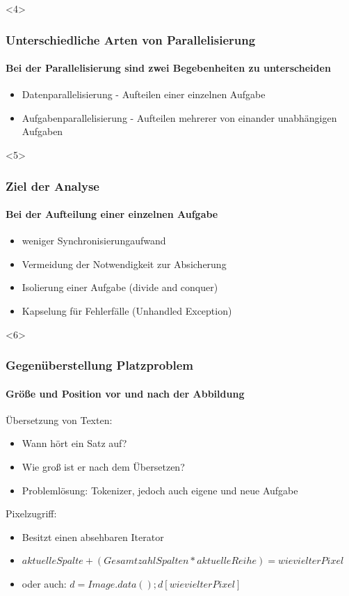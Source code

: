 \documentclass{beamer}
\begin{document}
\begin{frame}<4>
  \frametitle{Unterschiedliche Arten von Parallelisierung}
  \framesubtitle{Bei der Parallelisierung sind zwei Begebenheiten zu unterscheiden}
  \begin{itemize}
    \item Datenparallelisierung - Aufteilen einer einzelnen Aufgabe
    \item Aufgabenparallelisierung - Aufteilen mehrerer von einander unabhängigen Aufgaben
  \end{itemize}

\end{frame}

\begin{frame}<5>
  \frametitle{Ziel der Analyse}
  \framesubtitle{Bei der Aufteilung einer einzelnen Aufgabe}
  \begin{itemize}
    \item weniger Synchronisierungaufwand
    \item Vermeidung der Notwendigkeit zur Absicherung
    \item Isolierung einer Aufgabe  (divide and conquer)
    \item Kapselung für Fehlerfälle (Unhandled Exception)
  \end{itemize}

\end{frame}

\begin{frame}<6>
  \frametitle{Gegenüberstellung Platzproblem}
  \framesubtitle{Größe und Position vor und nach der Abbildung}
  Übersetzung von Texten:
  \begin{itemize}
    \item  Wann hört ein Satz auf? 
    \item  Wie groß ist er nach dem Übersetzen? 
    \item  Problemlösung: Tokenizer, jedoch auch eigene und neue Aufgabe
  \end{itemize}
  
  Pixelzugriff:
  \begin{itemize}
    \item  Besitzt einen absehbaren Iterator
    \item  $aktuelle Spalte+(Gesamtzahl Spalten*aktuelle Reihe) = wievielter Pixel$
    \item  oder auch: $d = Image.data(); d[wievielter Pixel]$
  \end{itemize}
  
\end{frame}
\end{document}
